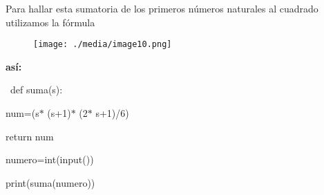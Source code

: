 \documentclass[12pt]{article}
\renewcommand{\_}{\kern-1.5pt\textunderscore\kern-1.5pt}
\begin{document}


\vspace{\baselineskip}
\setlength{\parskip}{0.0pt}
\setlength{\parskip}{8.04pt}
\setlength{\parskip}{0.0pt}
\begin{adjustwidth}{0.5in}{0.0in}
\begin{justify}
{\fontsize{10pt}{12.0pt}\selectfont \textbf{ }Para hallar esta sumatoria de los primeros números naturales al cuadrado utilizamos la fórmula\par}
\end{justify}\par

\end{adjustwidth}




\begin{figure}[H]
	\begin{Center}
		\texttt{[image: ./media/image10.png]}
	\end{Center}
\end{figure}



\par

{\fontsize{10pt}{12.0pt}\selectfont \textbf{así:}\par}\par

{\fontsize{10pt}{12.0pt}\selectfont \  def suma(s):\par}\par

{\fontsize{10pt}{12.0pt}\selectfont  num=(s$\ast$ (s+1)$\ast$ (2$\ast$ s+1)/6)\par}\par

{\fontsize{10pt}{12.0pt}\selectfont  return num\par}\par

{\fontsize{10pt}{12.0pt}\selectfont numero=int(input())\par}\par

{\fontsize{10pt}{12.0pt}\selectfont print(suma(numero))\par}\par
\end{document}
